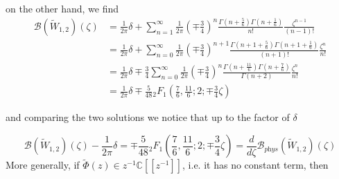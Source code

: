 \documentclass{article}
\newcommand{\C}{\mathbb{C}}
\begin{document}
on the other hand, we find
\begin{align*}
\mathcal{B}(\tilde{W}_{1,2})(\zeta)&=\frac{1}{2\pi}\delta+\sum_{n=1}^{\infty} \frac{1}{2\pi}\left(\mp\frac{3}{4}\right)^{n}\frac{\Gamma(n+\frac{5}{6})\Gamma(n+\frac{1}{6})}{n!}\frac{\zeta^{n-1}}{(n-1)!}\\
&=\frac{1}{2\pi}\delta+\sum_{n=0}^{\infty} \frac{1}{2\pi}\left(\mp\frac{3}{4}\right)^{n+1}\frac{\Gamma(n+1+\frac{5}{6})\Gamma(n+1+\frac{1}{6})}{(n+1)!}\frac{\zeta^{n}}{n!}\\
&=\frac{1}{2\pi}\delta\mp\frac{3}{4}\sum_{n=0}^{\infty} \frac{1}{2\pi}\left(\mp\frac{3}{4}\right)^{n}\frac{\Gamma(n+\frac{11}{6})\Gamma(n+\frac{7}{6})}{\Gamma(n+2)}\frac{\zeta^{n}}{n!}\\
&=\frac{1}{2\pi}\delta\mp\frac{5}{48} {}_2F_1\left(\frac{7}{6},\frac{11}{6};2;\mp\frac{3}{4}\zeta\right)%
\end{align*}

and comparing the two solutions we notice that up to the factor of $\delta$

\begin{equation}\label{Borel-W12}
\mathcal{B}(\tilde{W}_{1,2})(\zeta)-\frac{1}{2\pi}\delta=\mp \frac{5}{48} {}_2F_1\left(\frac{7}{6},\frac{11}{6};2;\mp\frac{3}{4}\zeta\right)=\frac{d}{d\zeta}\mathcal{B}_{\textit{phys}}(\tilde{W}_{1,2})(\zeta) 
\end{equation}
More generally, if $\tilde{\Phi}(z)\in z^{-1}\C[\![z^{-1}]\!]$, i.e. it has no constant term, then 
\end{document}
